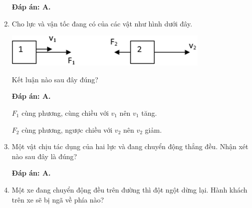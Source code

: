 \begin{enumerate}[label=\bfseries Câu \arabic*:]
	\hideall
	{\textbf{Đáp án: A.}
		
	}
	
	\item {}
	
	
	{Cho lực và vận tốc đang có của các vật như hình dưới đây.
		\begin{center}
			\includegraphics[scale=1]{../figs/VN10-2021-PH-TP0002-1.png}
		\end{center}
		Kết luận nào sau đây đúng?
	}
	
	\hideall
	{	\textbf{Đáp án: A.}
		
		$F_1$ cùng phương, cùng chiều với $v_1$ nên $v_1$ tăng.
		
		$F_2$ cùng phương, ngược chiều với $v_2$ nên $v_2$ giảm.
		
	}
	\item {}
	
	
	{Một vật chịu tác dụng của hai lực và đang chuyển động thẳng đều. Nhận xét nào sau đây là đúng?
	}
	
	\hideall
	{\textbf{Đáp án: A.}	
		
		
	}
	\item {}
	
	
	{Một xe đang chuyển động đều trên đường thì đột ngột dừng lại. Hành khách trên xe sẽ bị ngã về phía nào?
		
		
}
\end{enumerate}
